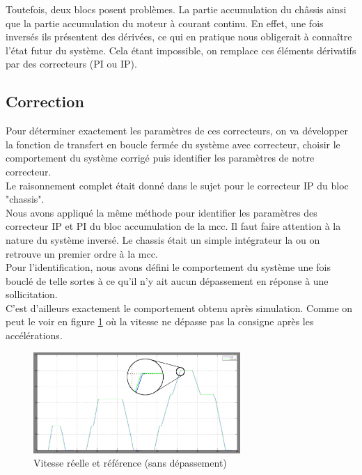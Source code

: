 
Toutefois, deux blocs posent problèmes. La partie accumulation du châssis ainsi que la partie accumulation du moteur à courant continu. En effet, une fois inversés ils présentent des dérivées, ce qui en pratique nous obligerait à connaître l'état futur du système. Cela étant impossible, on remplace ces éléments dérivatifs par des correcteurs (PI ou IP).\\

\newpage
\subsection{Correction}
Pour déterminer exactement les paramètres de ces correcteurs, on va développer la fonction de transfert en boucle fermée du système avec correcteur, choisir le comportement du système corrigé puis identifier les paramètres de notre correcteur.\\ Le raisonnement complet était donné dans le sujet pour le correcteur IP du bloc "chassis".\\

Nous avons appliqué la même méthode pour identifier les paramètres des correcteur IP et PI du bloc accumulation de la mcc. Il faut faire attention à la nature du système inversé. Le chassis était un simple intégrateur la ou on retrouve un premier ordre à la mcc.\\

Pour l'identification, nous avons défini le comportement du système une fois bouclé de telle sortes à ce qu'il n'y ait aucun dépassement en réponse à une sollicitation.\\

C'est d'ailleurs exactement le comportement obtenu après simulation. Comme on peut le voir en figure \ref{img:vitesse} où la vitesse ne dépasse pas la consigne après les accélérations.\\

\begin{figure}[ht]
\begin{center}
	\includegraphics[width=0.7\textwidth]{images/vitesse_zoom}
	\caption{Vitesse réelle et référence (sans dépassement)}\label{img:vitesse} 
\end{center}
\end{figure}